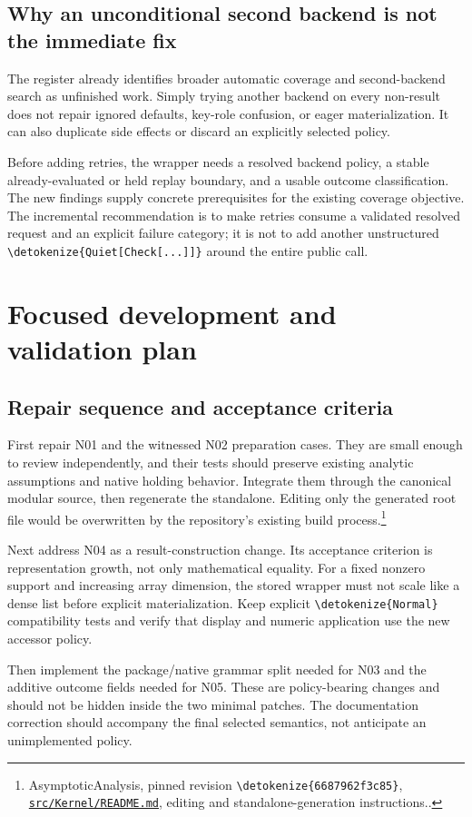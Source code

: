 \documentclass[11pt]{article}
\newcommand{\code}[1]{{\ttfamily\expandafter\nolinkurl\expandafter{\detokenize{#1}}}}
\newcommand{\repo}{https://github.com/VladimirReshetnikov/Asymptotic/blob/6687962f3c858a4f93623cfc496f33e35c6763d4/}
\newcommand{\src}[2]{\footnote{AsymptoticAnalysis, pinned revision \code{6687962f3c85}, \href{\repo#1}{\nolinkurl{#1}}, #2.}}
\begin{document}
\subsection{Why an unconditional second backend is not the immediate fix}
The register already identifies broader automatic coverage and second-backend search as unfinished work. Simply trying another backend on every non-result does not repair ignored defaults, key-role confusion, or eager materialization. It can also duplicate side effects or discard an explicitly selected policy.

Before adding retries, the wrapper needs a resolved backend policy, a stable already-evaluated or held replay boundary, and a usable outcome classification. The new findings supply concrete prerequisites for the existing coverage objective. The incremental recommendation is to make retries consume a validated resolved request and an explicit failure category; it is not to add another unstructured \code{Quiet[Check[...]]} around the entire public call.

\section{Focused development and validation plan}

\subsection{Repair sequence and acceptance criteria}
First repair N01 and the witnessed N02 preparation cases. They are small enough to review independently, and their tests should preserve existing analytic assumptions and native holding behavior. Integrate them through the canonical modular source, then regenerate the standalone. Editing only the generated root file would be overwritten by the repository's existing build process.\src{src/Kernel/README.md}{editing and standalone-generation instructions.}

Next address N04 as a result-construction change. Its acceptance criterion is representation growth, not only mathematical equality. For a fixed nonzero support and increasing array dimension, the stored wrapper must not scale like a dense list before explicit materialization. Keep explicit \code{Normal} compatibility tests and verify that display and numeric application use the new accessor policy.

Then implement the package/native grammar split needed for N03 and the additive outcome fields needed for N05. These are policy-bearing changes and should not be hidden inside the two minimal patches. The documentation correction should accompany the final selected semantics, not anticipate an unimplemented policy.
\end{document}
